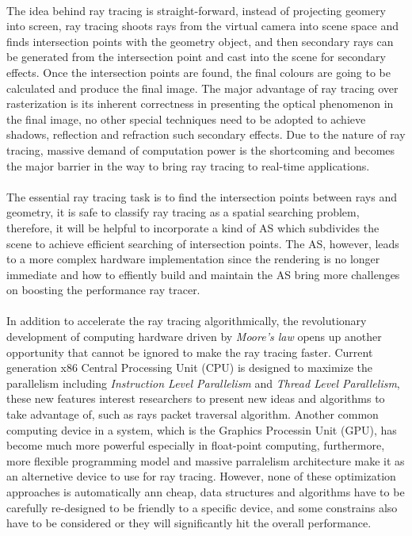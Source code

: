\paragraph{}
The idea behind ray tracing is straight-forward, instead of projecting geomery into screen, ray tracing shoots rays from the virtual camera into scene space and finds intersection points with the geometry object, and then secondary rays can be generated from the intersection point and cast into the scene for secondary effects. Once the intersection points are found, the final colours are going to be calculated and produce the final image. The major advantage of ray tracing over rasterization is its inherent correctness in presenting the optical phenomenon in the final image, no other special techniques need to be adopted to achieve shadows, reflection and refraction such secondary effects. Due to the nature of ray tracing, massive demand of computation power is the shortcoming and becomes the major barrier in the way to bring ray tracing to real-time applications.
 
\paragraph{}
The essential ray tracing task is to find the intersection points between rays and geometry, it is safe to classify ray tracing as a spatial searching problem, therefore, it will be helpful to incorporate a kind of AS which subdivides the scene to achieve efficient searching of intersection points. The AS, however, leads to a more complex hardware implementation since the rendering is no longer immediate and how to effiently build and maintain the AS bring more challenges on boosting the performance ray tracer. 

\paragraph{}
In addition to accelerate the ray tracing algorithmically, the revolutionary development of computing hardware driven by \emph{Moore's law} opens up another opportunity that cannot be ignored to make the ray tracing faster. Current generation x86 Central Processing Unit (CPU) is designed to maximize the parallelism including \emph{Instruction Level Parallelism} and \emph{Thread Level Parallelism}, these new features interest researchers to present new ideas and algorithms to take advantage of, such as rays packet traversal algorithm. Another common computing device in a system, which is the Graphics Processin Unit (GPU), has become much more powerful especially in float-point computing, furthermore, more flexible programming model and massive parralelism architecture make it as an alternetive device to use for ray tracing. However, none of these optimization approaches is automatically ann cheap, data structures and algorithms have to be carefully re-designed to be friendly to a specific device, and some constrains also have to be considered or they will significantly hit the overall performance. 
